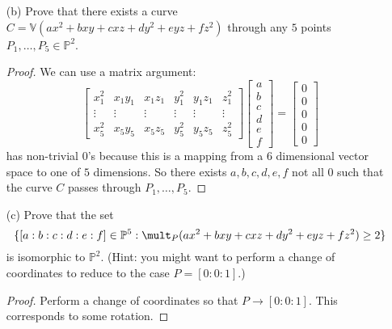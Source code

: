 \documentclass{article}
\begin{document}
\begin{itemize}
        \item [(b)] Prove that there exists a curve $C = \mathbb{V}(ax^{2} + bxy + cxz + dy^{2} + eyz + fz^{2})$ through any $5$ points $P_{1}, \ldots, P_{5} \in \mathbb{P}^{2}$.
            \begin{proof}
                We can use a matrix argument:
                    \begin{equation*}
                        \begin{bmatrix}
                            x_{1}^{2}  & x_{1}y_{1} & x_{1}z_{1} & y_{1}^{2} & y_{1}z_{1} & z_{1}^{2} \\
                            \vdots     &  \vdots    &  \vdots    &  \vdots   &  \vdots    &  \vdots   \\
                             x_{5}^{2} & x_{5}y_{5} & x_{5}z_{5} & y_{5}^{2} & y_{5}z_{5} & z_{5}^{2}   
                        \end{bmatrix}\begin{bmatrix}
                            a \\
                            b \\
                            c \\
                            d \\
                            e \\
                            f   
                        \end{bmatrix} = \begin{bmatrix}
                            0 \\
                            0 \\
                            0 \\
                            0 \\
                            0 
                        \end{bmatrix}
                    \end{equation*}
                has non-trivial $0$'s because this is a mapping from a $6$ dimensional vector space to one of $5$ dimensions. So there exists $a, b, c, d, e, f$ not all $0$ such that the curve $C$ passes through $P_{1}, \ldots, P_{ 5}$.
            \end{proof}

        \item [(c)] Prove that the set 
            \begin{equation*}
                \{[a : b : c : d : e : f] \in \mathbb{P}^{5} :  \mult_{P}(ax^{2} + bxy + cxz + dy^{2} + eyz + fz^{2}) \geq 2\}
            \end{equation*}
        is isomorphic to $\mathbb{P}^{2}$. (Hint: you might want to perform a change of coordinates to reduce to the case $P = [0 : 0 : 1]$.)
            \begin{proof}
                Perform a change of coordinates so that $P \rightarrow [0 : 0 : 1]$. This corresponds to some rotation.


\end{proof}
\end{itemize}
\end{document}
